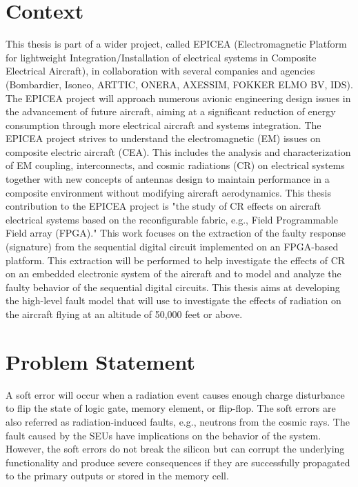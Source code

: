 
\section{Context}
\label{introduction}
This thesis is part of a wider project, called EPICEA (Electromagnetic Platform for lightweight 
Integration/Installation of electrical systems in Composite Electrical Aircraft), in collaboration with several 
companies and agencies (Bombardier, Isoneo, ARTTIC, ONERA, AXESSIM, FOKKER ELMO BV, IDS). The EPICEA project will approach
numerous avionic engineering design issues in the advancement of future aircraft, aiming at a significant
reduction of energy consumption through more electrical aircraft and systems integration. The EPICEA project strives to understand the electromagnetic (EM) issues on composite electric aircraft (CEA). This includes the analysis
and characterization of EM coupling, interconnects, and cosmic radiations (CR) on electrical systems together
with new concepts of antennas design to maintain performance in a composite environment without modifying
aircraft aerodynamics.
This thesis contribution to the EPICEA project is "the study of CR effects on aircraft electrical systems based on the reconfigurable fabric, e.g., Field Programmable Field array (FPGA)." This work focuses on the extraction of the faulty response (signature) from the sequential digital circuit implemented on an FPGA-based platform. This extraction will be performed to help investigate the effects of CR on an embedded electronic system of the aircraft and to model and analyze the faulty behavior of the sequential digital circuits. This thesis aims at developing the high-level fault model that will use to investigate the effects of radiation on the aircraft flying at an altitude of 50,000 feet or above. 
\section{Problem Statement}
A soft error will occur when a radiation event causes enough charge disturbance to flip the state of logic gate, memory element, or flip-flop. The soft errors are also referred as radiation-induced faults, e.g., neutrons from the cosmic rays. The fault caused by the SEUs have implications on the behavior of the system. However, the soft errors do not break the silicon but can corrupt the underlying functionality and produce severe consequences if they are successfully propagated to the primary outputs or stored in the memory cell.

